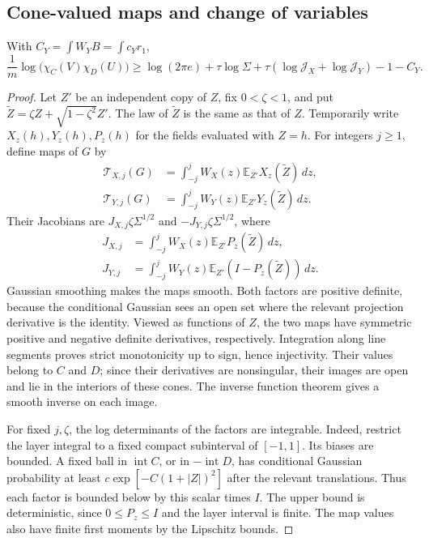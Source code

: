\subsection{Cone-valued maps and change of variables}
\begin{lemma}\label{lem:cone-entropy-maps}
With \(C_Y=\int W_YB=\int c_Yr_1\),
\[
\frac1m\log\bigl(\chi_C(V)\chi_D(U)\bigr)
\ge\log(2\pi e)+\tau\log\Sigma
+\tau(\log\mathcal J_X+\log\mathcal J_Y)-1-C_Y.
\]
\end{lemma}
\begin{proof}
Let \(Z'\) be an independent copy of \(Z\), fix \(0<\zeta<1\), and put
\(\widetilde Z=\zeta Z+\sqrt{1-\zeta^2}Z'\). The law of \(\widetilde Z\) is the same as that of \(Z\). Temporarily write \(X_z(h),Y_z(h),P_z(h)\) for the fields evaluated with \(Z=h\). For integers \(j\ge1\), define maps of \(G\) by
\[
\begin{aligned}
\mathcal T_{X,j}(G)&=\int_{-j}^jW_X(z)\mathbb E_{Z'}X_z(\widetilde Z)\,dz,\\
\mathcal T_{Y,j}(G)&=\int_{-j}^jW_Y(z)\mathbb E_{Z'}Y_z(\widetilde Z)\,dz.
\end{aligned}
\]
Their Jacobians are \(J_{X,j}\zeta\Sigma^{1/2}\) and \(-J_{Y,j}\zeta\Sigma^{1/2}\), where
\[
\begin{aligned}
J_{X,j}&=\int_{-j}^jW_X(z)\mathbb E_{Z'}P_z(\widetilde Z)\,dz,\\
J_{Y,j}&=\int_{-j}^jW_Y(z)\mathbb E_{Z'}(I-P_z(\widetilde Z))\,dz.
\end{aligned}
\]
Gaussian smoothing makes the maps smooth. Both factors are positive definite, because the conditional Gaussian sees an open set where the relevant projection derivative is the identity. Viewed as functions of \(Z\), the two maps have symmetric positive and negative definite derivatives, respectively. Integration along line segments proves strict monotonicity up to sign, hence injectivity. Their values belong to \(C\) and \(D\); since their derivatives are nonsingular, their images are open and lie in the interiors of these cones. The inverse function theorem gives a smooth inverse on each image.

For fixed \(j,\zeta\), the log determinants of the factors are integrable. Indeed, restrict the layer integral to a fixed compact subinterval of \([-1,1]\). Its biases are bounded. A fixed ball in \(\operatorname{int}C\), or in \(-\operatorname{int}D\), has conditional Gaussian probability at least \(c\exp[-C(1+|Z|)^2]\) after the relevant translations. Thus each factor is bounded below by this scalar times \(I\). The upper bound is deterministic, since \(0\le P_z\le I\) and the layer interval is finite. The map values also have finite first moments by the Lipschitz bounds.


\end{proof}
